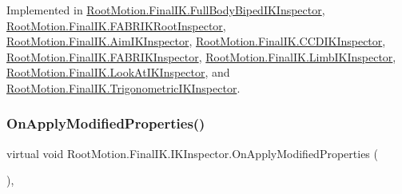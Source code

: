 Implemented in \mbox{\hyperlink{class_root_motion_1_1_final_i_k_1_1_full_body_biped_i_k_inspector_a5eb8e15b2fa1f2aeb03c68c79eac9887}{Root\+Motion.\+Final\+I\+K.\+Full\+Body\+Biped\+I\+K\+Inspector}}, \mbox{\hyperlink{class_root_motion_1_1_final_i_k_1_1_f_a_b_r_i_k_root_inspector_adbfccfa739bbac889779f0f728913138}{Root\+Motion.\+Final\+I\+K.\+F\+A\+B\+R\+I\+K\+Root\+Inspector}}, \mbox{\hyperlink{class_root_motion_1_1_final_i_k_1_1_aim_i_k_inspector_a52c15b4c53fd1abe0ca8cafc3fe9bd2a}{Root\+Motion.\+Final\+I\+K.\+Aim\+I\+K\+Inspector}}, \mbox{\hyperlink{class_root_motion_1_1_final_i_k_1_1_c_c_d_i_k_inspector_a2077a0326ba192d01ada269d2fbd4ab3}{Root\+Motion.\+Final\+I\+K.\+C\+C\+D\+I\+K\+Inspector}}, \mbox{\hyperlink{class_root_motion_1_1_final_i_k_1_1_f_a_b_r_i_k_inspector_ab4f6ad50b690754771819f879a728646}{Root\+Motion.\+Final\+I\+K.\+F\+A\+B\+R\+I\+K\+Inspector}}, \mbox{\hyperlink{class_root_motion_1_1_final_i_k_1_1_limb_i_k_inspector_a0ce61fd92732d883e1a8ea693e535756}{Root\+Motion.\+Final\+I\+K.\+Limb\+I\+K\+Inspector}}, \mbox{\hyperlink{class_root_motion_1_1_final_i_k_1_1_look_at_i_k_inspector_a42e09d47ffaafec4efd8292dc4817182}{Root\+Motion.\+Final\+I\+K.\+Look\+At\+I\+K\+Inspector}}, and \mbox{\hyperlink{class_root_motion_1_1_final_i_k_1_1_trigonometric_i_k_inspector_a5480f458e1727afab24bb318e752aef8}{Root\+Motion.\+Final\+I\+K.\+Trigonometric\+I\+K\+Inspector}}.

\mbox{\label{class_root_motion_1_1_final_i_k_1_1_i_k_inspector_a2909376aa17c40b7d7577761165d1c67}} 
\subsubsection{\texorpdfstring{On\+Apply\+Modified\+Properties()}{OnApplyModifiedProperties()}}
{\footnotesize\ttfamily virtual void Root\+Motion.\+Final\+I\+K.\+I\+K\+Inspector.\+On\+Apply\+Modified\+Properties (\begin{DoxyParamCaption}{ }\end{DoxyParamCaption})\hspace{0.3cm}{\ttfamily [protected]}, {\ttfamily [virtual]}}



